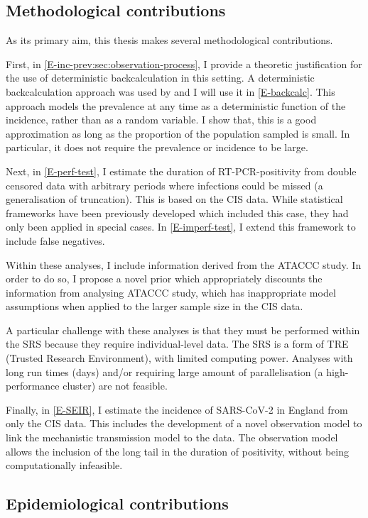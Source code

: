 \documentclass[thesis.tex]{subfiles}
\begin{document}
\subsection{Methodological contributions}

As its primary aim, this thesis makes several methodological contributions.

First, in \cref{E-inc-prev:sec:observation-process}, I provide a theoretic justification for the use of deterministic backcalculation in this setting.
A deterministic backcalculation approach was used by \textcite{abbottCISincidence} and I will use it in \cref{E-backcalc}.
This approach models the prevalence at any time as a deterministic function of the incidence, rather than as a random variable.
I show that, this is a good approximation as long as the proportion of the population sampled is small.
In particular, it does not require the prevalence or incidence to be large.

Next, in \cref{E-perf-test}, I estimate the duration of RT-PCR-positivity from double censored data with arbitrary periods where infections could be missed (a generalisation of truncation).
This is based on the CIS data.
While statistical frameworks have been previously developed which included this case, they had only been applied in special cases.
In \cref{E-imperf-test}, I extend this framework to include false negatives.

Within these analyses, I include information derived from the ATACCC study.
In order to do so, I propose a novel prior which appropriately discounts the information from analysing ATACCC study, which has inappropriate model assumptions when applied to the larger sample size in the CIS data.

A particular challenge with these analyses is that they must be performed within the SRS because they require individual-level data.
The SRS is a form of TRE (Trusted Research Environment), with limited computing power.
Analyses with long run times (\ie days) and/or requiring large amount of parallelisation (\eg a high-performance cluster) are not feasible.

Finally, in \cref{E-SEIR}, I estimate the incidence of SARS-CoV-2 in England from only the CIS data.
This includes the development of a novel observation model to link the mechanistic transmission model to the data.
The observation model allows the inclusion of the long tail in the duration of positivity, without being computationally infeasible.

\subsection{Epidemiological contributions}
\end{document}
